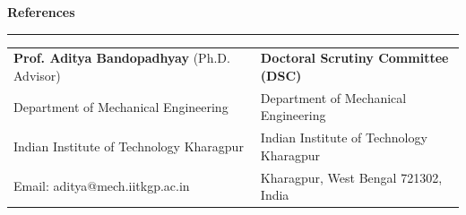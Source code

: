 \documentclass[10pt,letterpaper]{article}
\begin{document}
\noindent\textbf{\large References}
\vspace{2pt}
\hrule
\vspace{4pt}
\noindent
\begin{tabular*}{\textwidth}{@{\extracolsep{\fill}}ll}
    \textbf{Prof. Aditya Bandopadhyay} (Ph.D. Advisor) & \textbf{Doctoral Scrutiny Committee (DSC)} \\
    Department of Mechanical Engineering & Department of Mechanical Engineering \\
    Indian Institute of Technology Kharagpur & Indian Institute of Technology Kharagpur \\
    Email: aditya@mech.iitkgp.ac.in & Kharagpur, West Bengal 721302, India
\end{tabular*}
\end{document}
